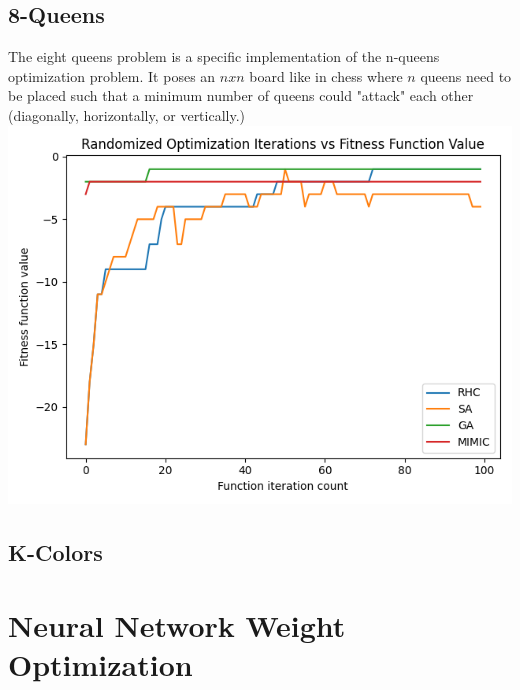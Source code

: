\documentclass[11pt]{article}
\begin{document}
    \subsection{8-Queens}
    The eight queens problem is a specific implementation of the n-queens optimization problem.\cite{Russel10} It poses
    an $n x n$ board like in chess where $n$ queens need to be placed such that a minimum number of queens could "attack"
    each other (diagonally, horizontally, or vertically.)
    \linebreak
    \includegraphics[scale=0.5]{eightqueens.png}

    \subsection{K-Colors}


    \section{Neural Network Weight Optimization}
    {}
    
\end{document}

